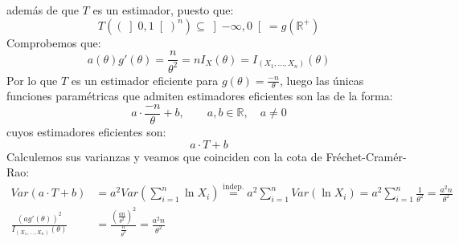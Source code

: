 \begin{ejercicio}
\begin{enumerate}[label=\alph*)]
            además de que $T$ es un estimador, puesto que:
            \begin{equation*}
                T({(\left]0,1\right[)}^{n}) \subseteq \left]-\infty,0\right[ = g(\mathbb{R}^+)
            \end{equation*}
            Comprobemos que:
            \begin{equation*}
                a(\theta)g'(\theta) = \frac{n}{\theta^2} = nI_X(\theta) = I_{(X_1, \ldots, X_n)}(\theta)
            \end{equation*}
            Por lo que $T$ es un estimador eficiente para $g(\theta) = \frac{-n}{\theta}$, luego las únicas funciones paramétricas que admiten estimadores eficientes son las de la forma:
            \begin{equation*}
                a\cdot \frac{-n}{\theta} + b, \qquad a,b\in \mathbb{R}, \quad a\neq 0
            \end{equation*}
            cuyos estimadores eficientes son:
            \begin{equation*}
                a\cdot T + b
            \end{equation*}
            Calculemos sus varianzas y veamos que coinciden con la cota de Fréchet-Cramér-Rao:
            \begin{align*}
                Var(a\cdot T+b) &= a^2 Var\left(\sum_{i=1}^{n}\ln X_i\right) \stackrel{\text{indep.}}{=} a^2 \sum_{i=1}^{n}Var(\ln X_i) = a^2 \sum_{i=1}^{n} \frac{1}{\theta^2} = \frac{a^2n}{\theta^2} \\
                \frac{{(ag'(\theta))}^{2}}{I_{(X_1,\ldots, X_n)}(\theta)} &= \frac{{(\frac{an}{\theta^2})}^{2}}{\frac{n}{\theta^2}} = \frac{a^2n}{\theta^2}
            \end{align*}
    \end{enumerate}
\end{ejercicio}
